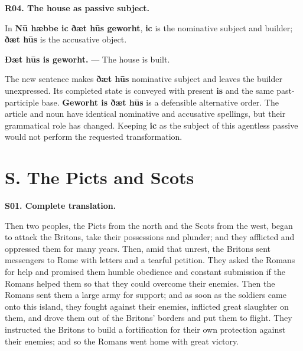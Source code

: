 \par\begin{minipage}{\linewidth}\raggedright
\textbf{R04. The house as passive subject.}

In \textbf{Nū hæbbe ic ðæt hūs geworht}, \textbf{ic} is the nominative subject and builder; \textbf{ðæt hūs} is the accusative object.

\textbf{Ðæt hūs is geworht.} — The house is built.

The new sentence makes \textbf{ðæt hūs} nominative subject and leaves the builder unexpressed. Its completed state is conveyed with present \textbf{is} and the same past-participle base. \textbf{Geworht is ðæt hūs} is a defensible alternative order. The article and noun have identical nominative and accusative spellings, but their grammatical role has changed. Keeping \textbf{ic} as the subject of this agentless passive would not perform the requested transformation.

\end{minipage}\par\addvspace{4pt}

\clearpage
\section*{S. The Picts and Scots}

\textbf{S01. Complete translation.}

Then two peoples, the Picts from the north and the Scots from the west, began to attack the Britons, take their possessions and plunder; and they afflicted and oppressed them for many years. Then, amid that unrest, the Britons sent messengers to Rome with letters and a tearful petition. They asked the Romans for help and promised them humble obedience and constant submission if the Romans helped them so that they could overcome their enemies. Then the Romans sent them a large army for support; and as soon as the soldiers came onto this island, they fought against their enemies, inflicted great slaughter on them, and drove them out of the Britons' borders and put them to flight. They instructed the Britons to build a fortification for their own protection against their enemies; and so the Romans went home with great victory.

